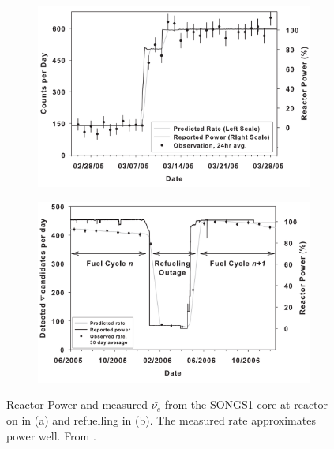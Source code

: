 \begin{figure}[!h]
\centering
\begin{subfigure}{.5\textwidth}
  \centering
  \includegraphics[width=\linewidth]{Chapter1/Figs/reactorPowerSongsS1.png}
  \captionsetup{width=.9\linewidth}
  \caption{}
  \label{subFig:reactorPowerSongsS1}
\end{subfigure}%
\begin{subfigure}{.5\textwidth}
  \centering
\includegraphics[width=\linewidth]{Chapter1/Figs/reactorRefulingSongs1.png}
  \captionsetup{width=.9\linewidth}
  \caption{}
  \label{subFig:reactorRefulingSongs1}
\end{subfigure}
\caption{Reactor Power and measured $\bar{\nu_e}$ from the SONGS1 core at reactor on in (a) and refuelling in (b). The measured rate approximates power well. From \cite{Bowden_2008}.}
\label{fig:reactorPowerAndRefuelingSongsS1}
\end{figure}

